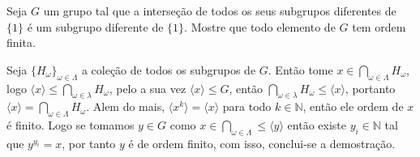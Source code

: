 \begin{homeworkProblem}
Seja $G$ um grupo tal que a interseção de todos os seus subgrupos diferentes de $\{1\}$ é um subgrupo diferente de $\{1\}$. Mostre que todo elemento de $G$ tem ordem finita.
  \begin{solution}
    Seja $\{H_\omega\}_{\omega\in\Lambda}$ a coleção de todos os subgrupos de $G$. Então tome $x\in \bigcap_{\omega\in\Lambda}H_\omega$, logo $\langle x\rangle\leq \bigcap_{\omega\in\lambda}H_\omega$, pelo a sua vez $\langle x\rangle\leq G$, então $\bigcap_{\omega\in\lambda}H_\omega\leq \langle x\rangle$, portanto $\langle x\rangle = \bigcap_{\omega\in\Lambda}H_\omega$. Alem do mais, $\langle x^{k}\rangle = \langle x\rangle$ para todo $k\in\mathbb{N}$, então ele ordem de $x$ é finito. Logo se tomamos $y\in G$ como $x\in \bigcap_{\omega\in\Lambda}\leq \langle y\rangle$ então existe $y_i\in\mathbb{N}$ tal que $y^{y_i}=x$, por tanto $y$ é de ordem finito, com isso, conclui-se a demostração. 
  \end{solution}
\end{homeworkProblem}
